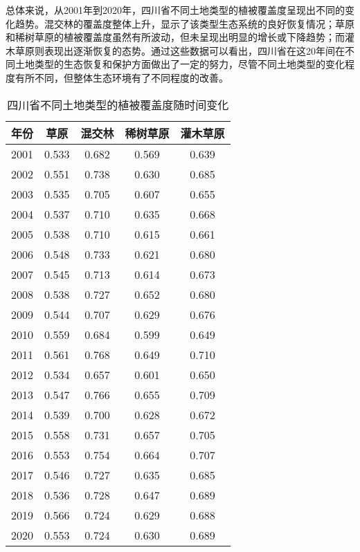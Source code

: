 \documentclass{article}
\begin{document}
		总体来说，从2001年到2020年，四川省不同土地类型的植被覆盖度呈现出不同的变化趋势。混交林的覆盖度整体上升，显示了该类型生态系统的良好恢复情况；草原和稀树草原的植被覆盖度虽然有所波动，但未呈现出明显的增长或下降趋势；而灌木草原则表现出逐渐恢复的态势。通过这些数据可以看出，四川省在这20年间在不同土地类型的生态恢复和保护方面做出了一定的努力，尽管不同土地类型的变化程度有所不同，但整体生态环境有了不同程度的改善。
			\begin{table}[H]
				\centering
				\begin{tabular}{|c|c|c|c|c|}
					\hline
					\textbf{年份} & \textbf{草原} & \textbf{混交林} & \textbf{稀树草原} & \textbf{灌木草原} \\
					\hline
					2001 & 0.533 & 0.682 & 0.569 & 0.639 \\
					2002 & 0.551 & 0.738 & 0.630 & 0.685 \\
					2003 & 0.535 & 0.705 & 0.607 & 0.655 \\
					2004 & 0.537 & 0.710 & 0.635 & 0.668 \\
					2005 & 0.538 & 0.710 & 0.615 & 0.661 \\
					2006 & 0.548 & 0.733 & 0.621 & 0.680 \\
					2007 & 0.545 & 0.713 & 0.614 & 0.673 \\
					2008 & 0.538 & 0.727 & 0.652 & 0.680 \\
					2009 & 0.544 & 0.707 & 0.629 & 0.676 \\
					2010 & 0.559 & 0.684 & 0.599 & 0.649 \\
					2011 & 0.561 & 0.768 & 0.649 & 0.710 \\
					2012 & 0.534 & 0.657 & 0.601 & 0.650 \\
					2013 & 0.547 & 0.766 & 0.655 & 0.709 \\
					2014 & 0.539 & 0.700 & 0.628 & 0.672 \\
					2015 & 0.558 & 0.731 & 0.657 & 0.705 \\
					2016 & 0.553 & 0.754 & 0.664 & 0.707 \\
					2017 & 0.546 & 0.727 & 0.635 & 0.685 \\
					2018 & 0.536 & 0.728 & 0.647 & 0.689 \\
					2019 & 0.566 & 0.724 & 0.629 & 0.688 \\
					2020 & 0.553 & 0.724 & 0.630 & 0.689 \\
					\hline
				\end{tabular}
				\caption{四川省不同土地类型的植被覆盖度随时间变化}
			\end{table}
\end{document}
